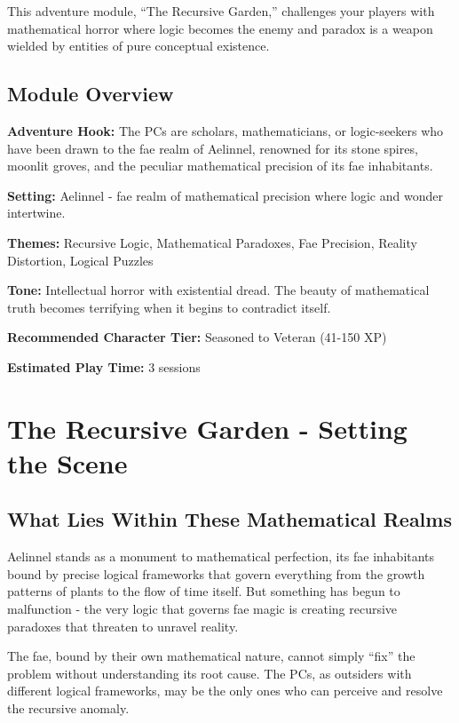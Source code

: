 \documentclass[11pt]{article}
\begin{document}
This adventure module, ``The Recursive Garden,'' challenges your players with mathematical horror where logic becomes the enemy and paradox is a weapon wielded by entities of pure conceptual existence.

\subsection{Module Overview}

\textbf{Adventure Hook:} The PCs are scholars, mathematicians, or logic-seekers who have been drawn to the fae realm of Aelinnel, renowned for its stone spires, moonlit groves, and the peculiar mathematical precision of its fae inhabitants.

\textbf{Setting:} Aelinnel - fae realm of mathematical precision where logic and wonder intertwine.

\textbf{Themes:} Recursive Logic, Mathematical Paradoxes, Fae Precision, Reality Distortion, Logical Puzzles

\textbf{Tone:} Intellectual horror with existential dread. The beauty of mathematical truth becomes terrifying when it begins to contradict itself.

\textbf{Recommended Character Tier:} Seasoned to Veteran (41-150 XP)

\textbf{Estimated Play Time:} 3 sessions

\section{The Recursive Garden - Setting the Scene}

\subsection{What Lies Within These Mathematical Realms}

Aelinnel stands as a monument to mathematical perfection, its fae inhabitants bound by precise logical frameworks that govern everything from the growth patterns of plants to the flow of time itself. But something has begun to malfunction - the very logic that governs fae magic is creating recursive paradoxes that threaten to unravel reality.

The fae, bound by their own mathematical nature, cannot simply ``fix'' the problem without understanding its root cause. The PCs, as outsiders with different logical frameworks, may be the only ones who can perceive and resolve the recursive anomaly.
\end{document}

